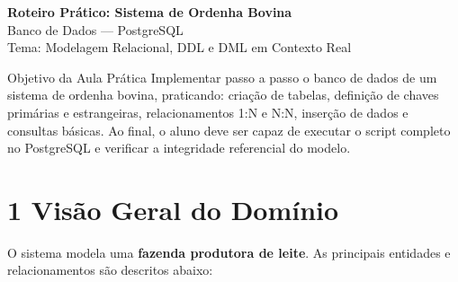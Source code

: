\documentclass[12pt]{article}
\begin{document}

\vspace*{0.2cm}
\begin{center}
  {\Large \textbf{Roteiro Prático: Sistema de Ordenha Bovina}}\\[0.2cm]
  {\large Banco de Dados --- PostgreSQL}\\[0.2cm]
  Tema: Modelagem Relacional, DDL e DML em Contexto Real
\end{center}

\vspace{0.3cm}

\begin{block}{Objetivo da Aula Prática}
Implementar passo a passo o banco de dados de um sistema de ordenha bovina,
praticando: criação de tabelas, definição de chaves primárias e estrangeiras,
relacionamentos 1:N e N:N, inserção de dados e consultas básicas.
Ao final, o aluno deve ser capaz de executar o script completo no PostgreSQL e
verificar a integridade referencial do modelo.
\end{block}

\vspace{0.4cm}

\section*{1 \enspace Visão Geral do Domínio}

O sistema modela uma \textbf{fazenda produtora de leite}. As principais entidades
e relacionamentos são descritos abaixo:
\end{document}
